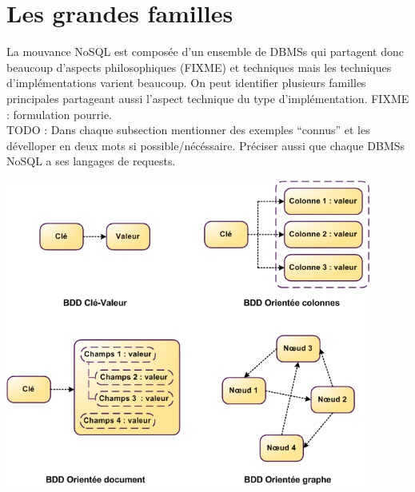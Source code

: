 \documentclass[11pt]{article}
\begin{document}
\section{Les grandes familles} %
La mouvance NoSQL est composée d'un ensemble de DBMSs qui partagent donc beaucoup d'aspects philosophiques (FIXME) et techniques mais les techniques d'implémentations varient beaucoup. On peut identifier plusieurs familles principales partageant aussi l'aspect technique du type d'implémentation. FIXME : formulation pourrie. \\
TODO : Dans chaque subsection mentionner des exemples ``connus'' et les dévelloper en deux mots si possible/nécéssaire. Préciser aussi que chaque DBMSs NoSQL a ses langages de requests.
\begin{center}
  \includegraphics[width=12cm]{nosql.png}
\end{center}
\end{document}
